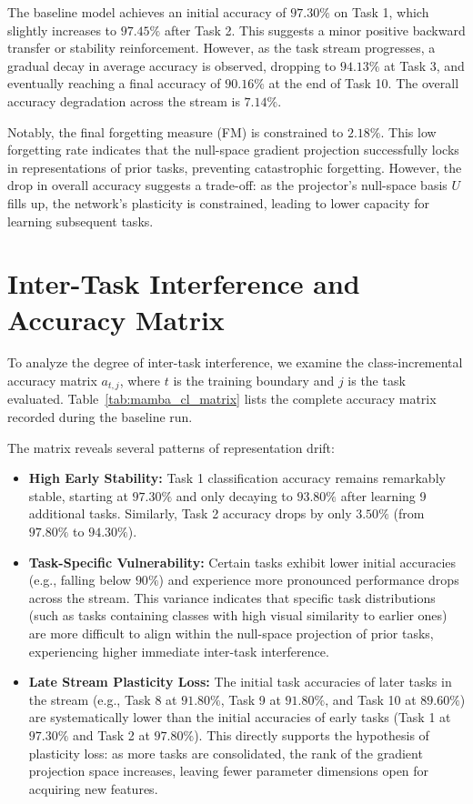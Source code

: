 The baseline model achieves an initial accuracy of $97.30\%$ on Task 1, which slightly increases to $97.45\%$ after Task 2. This suggests a minor positive backward transfer or stability reinforcement. However, as the task stream progresses, a gradual decay in average accuracy is observed, dropping to $94.13\%$ at Task 3, and eventually reaching a final accuracy of $90.16\%$ at the end of Task 10. The overall accuracy degradation across the stream is $7.14\%$. 

Notably, the final forgetting measure (FM) is constrained to $2.18\%$. This low forgetting rate indicates that the null-space gradient projection successfully locks in representations of prior tasks, preventing catastrophic forgetting. However, the drop in overall accuracy suggests a trade-off: as the projector's null-space basis $U$ fills up, the network's plasticity is constrained, leading to lower capacity for learning subsequent tasks.

\section{Inter-Task Interference and Accuracy Matrix}
\label{sec:matrix_analysis}

To analyze the degree of inter-task interference, we examine the class-incremental accuracy matrix $a_{t,j}$, where $t$ is the training boundary and $j$ is the task evaluated. Table~\ref{tab:mamba_cl_matrix} lists the complete accuracy matrix recorded during the baseline run.



The matrix reveals several patterns of representation drift:
\begin{itemize}
    \item \textbf{High Early Stability:} Task 1 classification accuracy remains remarkably stable, starting at $97.30\%$ and only decaying to $93.80\%$ after learning 9 additional tasks. Similarly, Task 2 accuracy drops by only $3.50\%$ (from $97.80\%$ to $94.30\%$).
    \item \textbf{Task-Specific Vulnerability:} Certain tasks exhibit lower initial accuracies (e.g., falling below $90\%$) and experience more pronounced performance drops across the stream. This variance indicates that specific task distributions (such as tasks containing classes with high visual similarity to earlier ones) are more difficult to align within the null-space projection of prior tasks, experiencing higher immediate inter-task interference.
    \item \textbf{Late Stream Plasticity Loss:} The initial task accuracies of later tasks in the stream (e.g., Task 8 at $91.80\%$, Task 9 at $91.80\%$, and Task 10 at $89.60\%$) are systematically lower than the initial accuracies of early tasks (Task 1 at $97.30\%$ and Task 2 at $97.80\%$). This directly supports the hypothesis of plasticity loss: as more tasks are consolidated, the rank of the gradient projection space increases, leaving fewer parameter dimensions open for acquiring new features.
\end{itemize}

